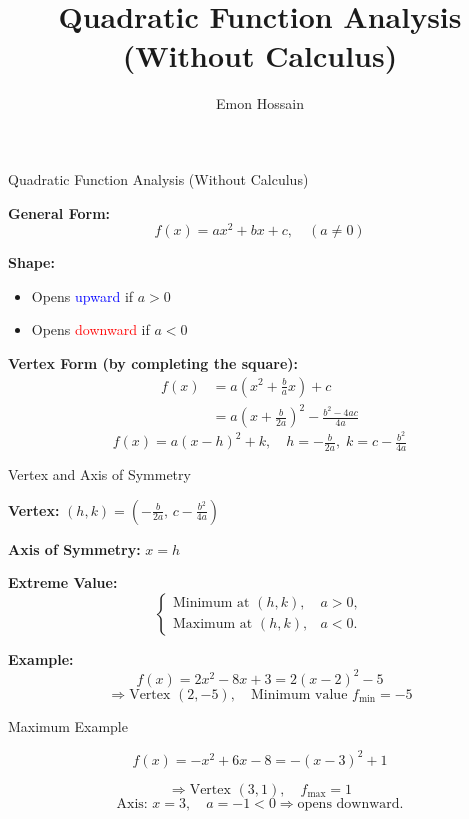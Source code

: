 \documentclass[12pt]{beamer}
\title[Quadratic Function Analysis]{Quadratic Function Analysis (Without Calculus)}
\author{Emon Hossain}
\institute[BRAC University]{Department of Mathematics and Natural Sciences \\ BRAC University}
\date{}
\begin{document}

\begin{frame}
  \titlepage
\end{frame}

\begin{frame}{Quadratic Function Analysis (Without Calculus)}

\textbf{General Form:}
\[
f(x) = ax^2 + bx + c, \quad (a \neq 0)
\]

\textbf{Shape:}
\begin{itemize}
    \item Opens \textcolor{blue}{upward} if $a > 0$
    \item Opens \textcolor{red}{downward} if $a < 0$
\end{itemize}

\pause
\textbf{Vertex Form (by completing the square):}
\[
\begin{aligned}
f(x) &= a(x^2 + \tfrac{b}{a}x) + c \\
     &= a\left(x + \tfrac{b}{2a}\right)^2 - \tfrac{b^2 - 4ac}{4a}
\end{aligned}
\]
\[
\boxed{f(x) = a(x - h)^2 + k}, \quad 
h = -\tfrac{b}{2a}, \; k = c - \tfrac{b^2}{4a}
\]

\end{frame}

\begin{frame}{Vertex and Axis of Symmetry}

\textbf{Vertex:} $(h, k) = \left(-\tfrac{b}{2a}, \, c - \tfrac{b^2}{4a}\right)$

\textbf{Axis of Symmetry:} $x = h$

\textbf{Extreme Value:}
\[
\begin{cases}
\text{Minimum at } (h, k), & a>0, \\[4pt]
\text{Maximum at } (h, k), & a<0.
\end{cases}
\]

\pause
\textbf{Example:}
\[
f(x) = 2x^2 - 8x + 3 = 2(x-2)^2 - 5
\]
\[
\Rightarrow \text{Vertex } (2, -5), \quad \text{Minimum value } f_{\min} = -5
\]

\end{frame}

\begin{frame}{Maximum Example}

\[
f(x) = -x^2 + 6x - 8 = -(x-3)^2 + 1
\]

\[
\Rightarrow \text{Vertex } (3, 1), \quad f_{\max} = 1
\]
\[
\text{Axis: } x = 3, \quad a = -1 < 0 \Rightarrow \text{opens downward.}
\]

\end{frame}
\end{document}
